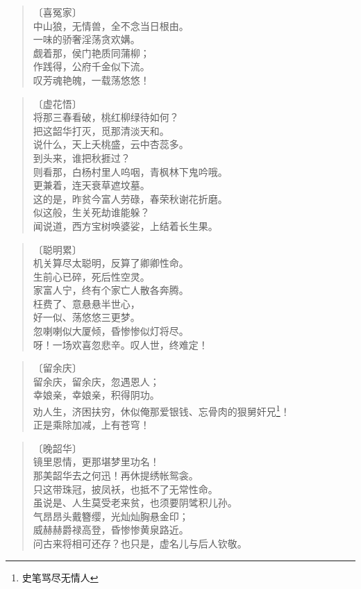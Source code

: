 \documentclass[12pt,oneside]{book}
\newenvironment{shici}{%
\begin{verse}%
\centering\large\hspace{12pt}}%
{\end{verse}}
\begin{document}
\begin{shici}
〔喜冤家〕\\
中山狼，无情兽，全不念当日根由。\\
一味的骄奢淫荡贪欢媾。\\
觑着那，侯门艳质同蒲柳；\\
作践得，公府千金似下流。\\
叹芳魂艳魄，一载荡悠悠！
\end{shici}

\begin{shici}
〔虚花悟〕\\
将那三春看破，桃红柳绿待如何？\\
把这韶华打灭，觅那清淡天和。\\
说什么，天上夭桃盛，云中杏蕊多。\\
到头来，谁把秋捱过？\\
则看那，白杨村里人呜咽，青枫林下鬼吟哦。\\
更兼着，连天衰草遮坟墓。\\
这的是，昨贫今富人劳碌，春荣秋谢花折磨。\\
似这般，生关死劫谁能躲？\\
闻说道，西方宝树唤婆娑，上结着长生果。
\end{shici}

\begin{shici}
〔聪明累〕\\
机关算尽太聪明，反算了卿卿性命。\\
生前心已碎，死后性空灵。\\
家富人宁，终有个家亡人散各奔腾。\\
枉费了、意悬悬半世心，\\
好一似、荡悠悠三更梦。\\
忽喇喇似大厦倾，昏惨惨似灯将尽。\\
呀！一场欢喜忽悲辛。叹人世，终难定！
\end{shici}

\begin{shici}
〔留余庆〕\\
留余庆，留余庆，忽遇恩人；\\
幸娘亲，幸娘亲，积得阴功。\\
劝人生，济困扶穷，休似俺那爱银钱、忘骨肉的狠舅奸兄\footnote{史笔骂尽无情人}！\\
正是乘除加减，上有苍穹！
\end{shici}

\begin{shici}
〔晚韶华〕\\
镜里恩情，更那堪梦里功名！\\
那美韶华去之何迅！再休提绣帐鸳衾。\\
只这带珠冠，披凤袄，也抵不了无常性命。\\
虽说是、人生莫受老来贫，也须要阴骘积儿孙。\\
气昂昂头戴簪缨，光灿灿胸悬金印；\\
威赫赫爵禄高登，昏惨惨黄泉路近。\\
问古来将相可还存？也只是，虚名儿与后人钦敬。
\end{shici}
\end{document}
